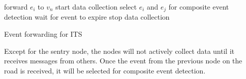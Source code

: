 \begin{algorithm}
\begin{algorithmic}[1]
			\STATE forward \(e_i\) to \(v_n\)
		\ENDFOR
	\ENDIF
		\STATE start data collection
			\STATE select \(e_i\) and \(e_j\) for composite event detection
		\ELSE
			\STATE wait for event to expire
		\ENDIF
		\STATE stop data collection
	\ENDIF
\end{algorithmic}
\caption{Event forwarding for ITS}
\label{algo:itsForward}
\end{algorithm}

Except for the sentry node, the nodes will not actively collect data until it receives messages from others. Once the event from the previous node on the road is received, it will be selected for composite event detection.